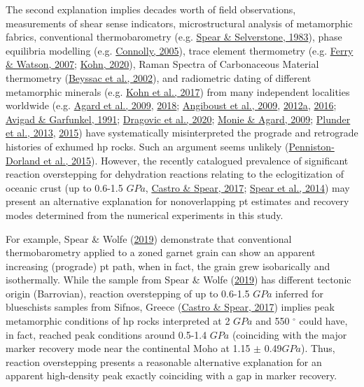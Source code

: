 The second explanation implies decades worth of field observations, measurements of shear sense indicators, microstructural analysis of metamorphic fabrics, conventional thermobarometry (e.g. \protect\hyperlink{ref-spear1983}{Spear \& Selverstone, 1983}), phase equilibria modelling (e.g. \protect\hyperlink{ref-connolly2005}{Connolly, 2005}), trace element thermometry (e.g. \protect\hyperlink{ref-ferry2007}{Ferry \& Watson, 2007}; \protect\hyperlink{ref-kohn2020}{Kohn, 2020}), Raman Spectra of Carbonaceous Material thermometry (\protect\hyperlink{ref-beyssac2002}{Beyssac et al., 2002}), and radiometric dating of different metamorphic minerals (e.g. \protect\hyperlink{ref-kohn2017}{Kohn et al., 2017}) from many independent localities worldwide (e.g. \protect\hyperlink{ref-agard2009}{Agard et al., 2009}, \protect\hyperlink{ref-agard2018}{2018}; \protect\hyperlink{ref-angiboust2009}{Angiboust et al., 2009}, \protect\hyperlink{ref-angiboust2012a}{2012a}, \protect\hyperlink{ref-angiboust2016}{2016}; \protect\hyperlink{ref-avigad1991}{Avigad \& Garfunkel, 1991}; \protect\hyperlink{ref-dragovic2020}{Dragovic et al., 2020}; \protect\hyperlink{ref-monie2009}{Monie \& Agard, 2009}; \protect\hyperlink{ref-plunder2013}{Plunder et al., 2013}, \protect\hyperlink{ref-plunder2015}{2015}) have systematically misinterpreted the prograde and retrograde histories of exhumed \gls{hp} rocks. Such an argument seems unlikely (\protect\hyperlink{ref-penniston2015}{Penniston-Dorland et al., 2015}). However, the recently catalogued prevalence of significant reaction overstepping for dehydration reactions relating to the eclogitization of oceanic crust (up to 0.6-1.5 \(GPa\), \protect\hyperlink{ref-castro2017}{Castro \& Spear, 2017}; \protect\hyperlink{ref-spear2014}{Spear et al., 2014}) may present an alternative explanation for nonoverlapping \gls{pt} estimates and recovery modes determined from the numerical experiments in this study.

For example, Spear \& Wolfe (\protect\hyperlink{ref-spear2019}{2019}) demonstrate that conventional thermobarometry applied to a zoned garnet grain can show an apparent increasing (prograde) \gls{pt} path, when in fact, the grain grew isobarically and isothermally. While the sample from Spear \& Wolfe (\protect\hyperlink{ref-spear2019}{2019}) has different tectonic origin (Barrovian), reaction overstepping of up to 0.6-1.5 \(GPa\) inferred for blueschists samples from Sifnos, Greece (\protect\hyperlink{ref-castro2017}{Castro \& Spear, 2017}) implies peak metamorphic conditions of \gls{hp} rocks interpreted at 2 \(GPa\) and 550 \(^\circ\) could have, in fact, reached peak conditions around 0.5-1.4 \(GPa\) (coinciding with the major marker recovery mode near the continental Moho at 1.15 \(\pm\) 0.49\(GPa\)). Thus, reaction overstepping presents a reasonable alternative explanation for an apparent high-density peak exactly coinciding with a gap in marker recovery.

